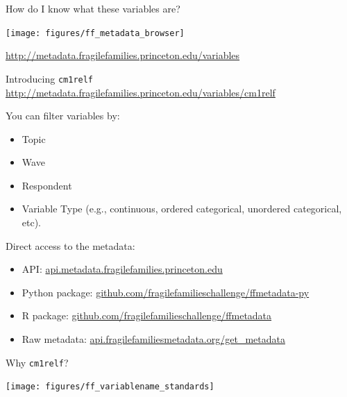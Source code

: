 \documentclass[aspectratio=169]{beamer}
\begin{document}
\begin{frame}

How do I know what these variables are? 

\begin{center}
\texttt{[image: figures/ff\_metadata\_browser]}
\end{center}

\vfill

\url{http://metadata.fragilefamilies.princeton.edu/variables}

\end{frame}
\begin{frame}

Introducing \texttt{cm1relf}\\

\url{http://metadata.fragilefamilies.princeton.edu/variables/cm1relf}

\end{frame}
\begin{frame}

You can filter variables by:
\begin{itemize}
\item Topic
\item Wave
\item Respondent
\item Variable Type (e.g., continuous, ordered categorical, unordered categorical, etc).
\end{itemize}

\end{frame}	
\begin{frame}

Direct access to the metadata:
\begin{itemize}
\item API: \url{api.metadata.fragilefamilies.princeton.edu}
\item Python package: \url{github.com/fragilefamilieschallenge/ffmetadata-py}
\item R package: \url{github.com/fragilefamilieschallenge/ffmetadata}
\item Raw metadata: \url{api.fragilefamiliesmetadata.org/get_metadata}
\end{itemize}

\end{frame}
\begin{frame}

Why \texttt{cm1relf}? \pause

\begin{center}
\texttt{[image: figures/ff\_variablename\_standards]}
\end{center}

\end{frame}
\end{document}
